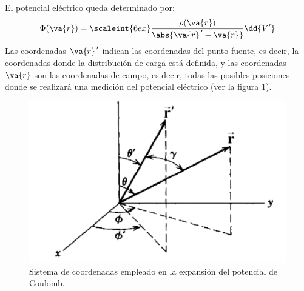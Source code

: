 El potencial eléctrico queda determinado por:
\begin{align}
\Phi (\va{r}) = \scaleint{6ex} \dfrac{\rho(\va{r})}{\abs{\va{r}^{\, \prime} - \va{r}}} \dd{V^{\prime}}
\label{eq:ecuacion_01}
\end{align}
Las coordenadas $\va{r}^{\, \prime}$ indican las coordenadas del punto fuente, es decir, la coordenadas donde la distribución de carga está definida, y las coordenadas $\va{r}$ son las coordenadas de campo, es decir, todas las posibles posiciones donde se realizará una medición del potencial eléctrico (ver la figura 1).
\begin{figure}[H]
    \centering
    \includegraphics[scale=0.5]{Imagenes/Potencial_Coulomb.png}
    \caption{Sistema de coordenadas empleado en la expansión del potencial de Coulomb.}
    \label{fig:figura_01}
\end{figure}

